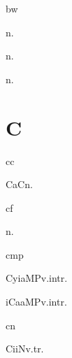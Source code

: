 \begin{multicols*}{2}
\begin{dictroot}{bw}{\bigglot}
    \begin{dictentry}{}{n.}
    \end{dictentry}
    \begin{dictentry}{}{n.}
    \end{dictentry}
    \begin{dictentry}{}{n.}
    \end{dictentry}
\end{dictroot}

\section*{C}

\begin{dictroot}{c}{c}
    \begin{dictentry}{CaC}{n.}
    \end{dictentry}
\end{dictroot}

\begin{dictroot}{c}{f}
    \begin{dictentry}{}{n.}
    \end{dictentry}
\end{dictroot}

\begin{dictroot}{c}{mp}
    \begin{dictentry}{CyiaMP}{v.intr.}
    \end{dictentry}
    \begin{dictentry}{iCaaMP}{v.intr.}
    \end{dictentry}
\end{dictroot}

\begin{dictroot}{c}{n}
    \begin{dictentry}{CiiN}{v.tr.}
    \end{dictentry}
\end{dictroot}


\end{multicols*}
